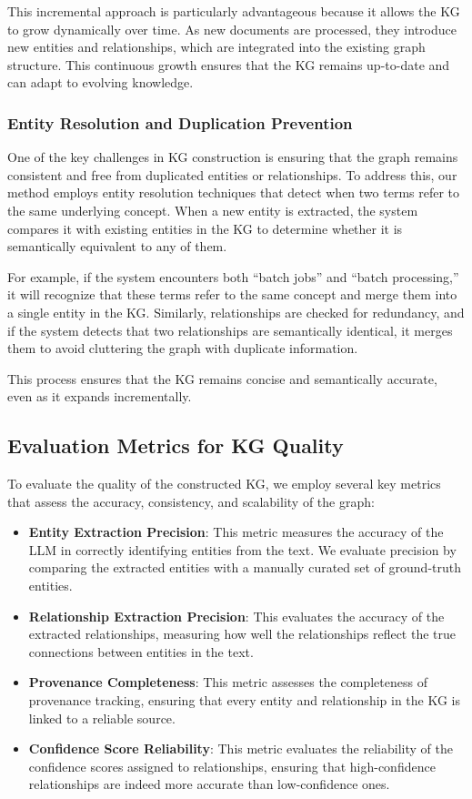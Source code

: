 This incremental approach is particularly advantageous because it allows the KG to grow dynamically over time. As new documents are processed, they introduce new entities and relationships, which are integrated into the existing graph structure. This continuous growth ensures that the KG remains up-to-date and can adapt to evolving knowledge.

\subsubsection{Entity Resolution and Duplication Prevention}

One of the key challenges in KG construction is ensuring that the graph remains consistent and free from duplicated entities or relationships. To address this, our method employs entity resolution techniques that detect when two terms refer to the same underlying concept. When a new entity is extracted, the system compares it with existing entities in the KG to determine whether it is semantically equivalent to any of them.

For example, if the system encounters both “batch jobs” and “batch processing,” it will recognize that these terms refer to the same concept and merge them into a single entity in the KG. Similarly, relationships are checked for redundancy, and if the system detects that two relationships are semantically identical, it merges them to avoid cluttering the graph with duplicate information.

This process ensures that the KG remains concise and semantically accurate, even as it expands incrementally.

\subsection{Evaluation Metrics for KG Quality}

To evaluate the quality of the constructed KG, we employ several key metrics that assess the accuracy, consistency, and scalability of the graph:
\begin{itemize}
    \item \textbf{Entity Extraction Precision}: This metric measures the accuracy of the LLM in correctly identifying entities from the text. We evaluate precision by comparing the extracted entities with a manually curated set of ground-truth entities.
    \item \textbf{Relationship Extraction Precision}: This evaluates the accuracy of the extracted relationships, measuring how well the relationships reflect the true connections between entities in the text.
    \item \textbf{Provenance Completeness}: This metric assesses the completeness of provenance tracking, ensuring that every entity and relationship in the KG is linked to a reliable source.
    \item \textbf{Confidence Score Reliability}: This metric evaluates the reliability of the confidence scores assigned to relationships, ensuring that high-confidence relationships are indeed more accurate than low-confidence ones.
\end{itemize}

